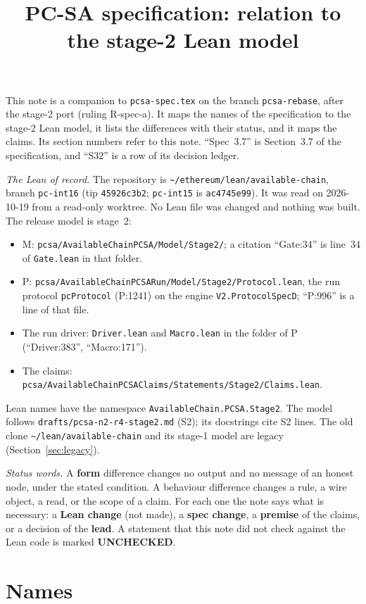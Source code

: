 \documentclass{article}
\title{PC-SA specification: relation to the stage-2 Lean model}
\author{}
\date{}
\newcommand{\nm}[1]{\nolinkurl{#1}}
\newcommand{\Lc}{\textbf{Lean change}}
\newcommand{\Sc}{\textbf{spec change}}
\newcommand{\Ld}{\textbf{lead}}
\newcommand{\Pm}{\textbf{premise}}
\newcommand{\Fm}{\textbf{form}}
\newcommand{\UC}{\textbf{UNCHECKED}}
\begin{document}
\maketitle

This note is a companion to \nm{pcsa-spec.tex} on the branch
\nm{pcsa-rebase}, after the stage-2 port (ruling R-spec-a).  It maps the
names of the specification to the stage-2 Lean model, it lists the
differences with their status, and it maps the claims.  Its section
numbers refer to this note.  ``Spec~3.7'' is Section~3.7 of the
specification, and ``S32'' is a row of its decision ledger.

\emph{The Lean of record.}  The repository is
\nm{~/ethereum/lean/available-chain}, branch \nm{pc-int16} (tip
\nm{45926c3b2}; \nm{pc-int15} is \nm{ac4745e99}).  It was read on
2026-10-19 from a read-only worktree.  No Lean file was changed and
nothing was built.  The release model is stage~2:
\begin{itemize}
\item M: \nm{pcsa/AvailableChainPCSA/Model/Stage2/}; a citation
  ``Gate:34'' is line~34 of \nm{Gate.lean} in that folder.
\item P: \nm{pcsa/AvailableChainPCSARun/Model/Stage2/Protocol.lean}, the
  run protocol \nm{pcProtocol} (P:1241) on the engine
  \nm{V2.ProtocolSpecD}; ``P:996'' is a line of that file.
\item The run driver: \nm{Driver.lean} and \nm{Macro.lean} in the folder
  of P (``Driver:383'', ``Macro:171'').
\item The claims:
  \nm{pcsa/AvailableChainPCSAClaims/Statements/Stage2/Claims.lean}.
\end{itemize}
Lean names have the namespace \nm{AvailableChain.PCSA.Stage2}.  The model
follows \nm{drafts/pcsa-n2-r4-stage2.md} (S2); its docstrings cite S2
lines.  The old clone \nm{~/lean/available-chain} and its stage-1 model
are legacy (Section~\ref{sec:legacy}).

\emph{Status words.}  A \Fm{} difference changes no output and no message
of an honest node, under the stated condition.  A behaviour difference
changes a rule, a wire object, a read, or the scope of a claim.  For each
one the note says what is necessary: a \Lc{} (not made), a \Sc{}, a
\Pm{} of the claims, or a decision of the \Ld.  A statement that this note
did not check against the Lean code is marked \UC.

\section{Names}\label{sec:names}
\end{document}
